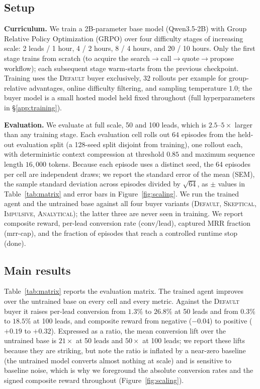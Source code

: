 \documentclass{article} %
\begin{document}
\subsection{Setup}
\textbf{Curriculum.} We train a 2B-parameter base model (Qwen3.5-2B) with Group Relative Policy Optimization (GRPO)
\citep{shao2024deepseekmath} over four difficulty stages of increasing scale: 2 leads / 1 hour, 4 / 2 hours, 8 / 4
hours, and 20 / 10 hours. Only the first stage trains from scratch (to acquire the
search$\rightarrow$call$\rightarrow$quote$\rightarrow$propose workflow); each subsequent stage warm-starts from the
previous checkpoint. Training uses the \textsc{Default} buyer exclusively, $32$ rollouts per example for
group-relative advantages, online difficulty filtering, and sampling temperature $1.0$; the buyer model is a small
hosted model held fixed throughout (full hyperparameters in \S\ref{app:training}).

\textbf{Evaluation.} We evaluate at full scale, 50 and 100 leads, which is $2.5\text{--}5\times$ larger than any
training stage. Each evaluation cell rolls out $64$ episodes from the held-out evaluation split (a 128-seed split
disjoint from training), one rollout each, with deterministic context compression at threshold $0.85$ and maximum
sequence length $16{,}000$ tokens. Because each episode uses a distinct seed, the 64 episodes per cell are
independent draws; we report the standard error of the mean (SEM), the sample standard deviation across episodes
divided by $\sqrt{64}$, as $\pm$ values in Table~\ref{tab:matrix} and error bars in Figure~\ref{fig:scaling}. We run
the trained agent and the untrained base against all four buyer variants (\textsc{Default}, \textsc{Skeptical},
\textsc{Impulsive}, \textsc{Analytical}); the latter three are never seen in training. We report composite reward,
per-lead conversion rate (conv/lead), captured MRR fraction (mrr-cap), and the fraction of episodes that reach a
controlled runtime stop (done).

\subsection{Main results}
\label{sec:main}
Table~\ref{tab:matrix} reports the evaluation matrix. The trained agent improves over the untrained base on every
cell and every metric. Against the \textsc{Default} buyer it raises per-lead conversion from $1.3\%$ to $26.8\%$ at
50 leads and from $0.3\%$ to $18.5\%$ at 100 leads, and composite reward from negative ($-0.04$) to positive
($+0.19$ to $+0.32$). Expressed as a ratio, the mean conversion lift over the untrained base is $21\times$ at 50
leads and $50\times$ at 100 leads; we report these lifts because they are striking, but note the ratio is inflated
by a near-zero baseline (the untrained model converts almost nothing at scale) and is sensitive to baseline noise,
which is why we foreground the absolute conversion rates and the signed composite reward throughout
(Figure~\ref{fig:scaling}).
\end{document}
